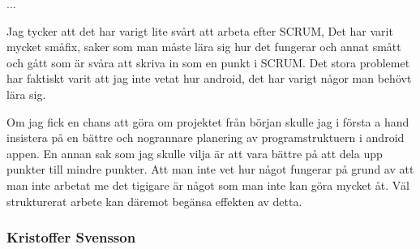 ...

Jag tycker att det har varigt lite svårt att arbeta efter SCRUM, 
Det har varit mycket småfix, saker som man måste lära sig hur det fungerar och annat smått och gått som är svåra att skriva in som en punkt i SCRUM.
Det stora problemet har faktiskt varit att jag inte vetat hur android, det har varigt någor man behövt lära sig. 

Om jag fick en chans att göra om projektet från början skulle jag i första a hand insistera på en bättre och nogrannare planering av programstruktuern i android appen.
En annan sak som jag skulle vilja är att vara bättre på att dela upp punkter till mindre punkter.
Att man inte vet hur något fungerar på grund av att man inte arbetat me det tigigare är något som man inte kan göra mycket åt. Väl strukturerat arbete kan däremot begänsa effekten av detta.
\subsubsection{Kristoffer Svensson}
